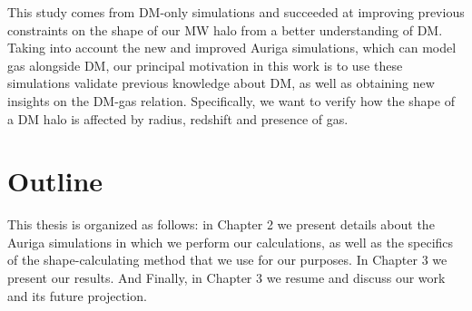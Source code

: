 This study comes from DM-only simulations and succeeded at improving previous constraints on the shape of our MW halo from a better understanding of DM. Taking into account the new and improved Auriga simulations, which can model gas alongside DM, our principal motivation in this work is to use these simulations validate previous knowledge about DM, as well as obtaining new insights on the DM-gas relation. Specifically, we want to verify how the shape of a DM halo is affected by radius, redshift and presence of gas.\\

%

\section{Outline}
This thesis is organized as follows: in Chapter 2 we present details about the Auriga simulations in which we perform our calculations, as well as the specifics of the shape-calculating method that we use for our purposes. In Chapter 3 we present our results. And Finally, in Chapter 3 we resume and discuss our work and its future projection.  
